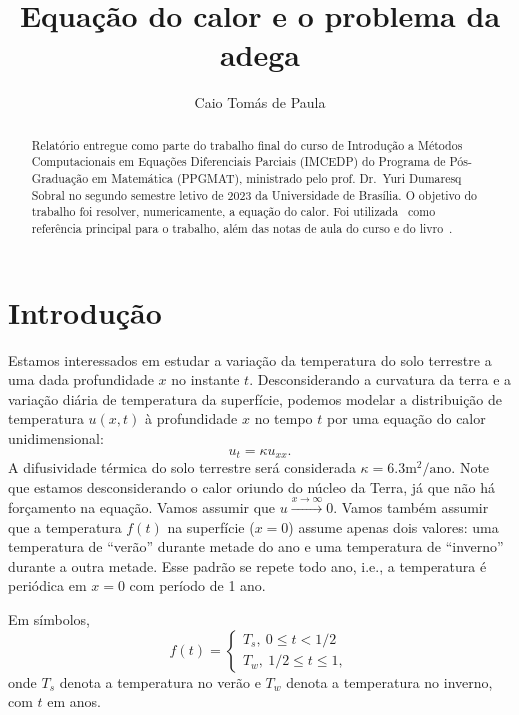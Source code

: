\documentclass[twocolumn,showpacs,%
  nofootinbib,aps,superscriptaddress,%
  eqsecnum,prd,notitlepage,showkeys,10pt]{revtex4-1} %
\renewcommand{\leq}{\leqslant}
\begin{document}
\title{
  Equação do calor e o problema da adega
}
\author{Caio Tomás de Paula}
%
\begin{abstract}
    Relatório entregue como parte do trabalho final do curso de Introdução a
    Métodos Computacionais em Equações Diferenciais Parciais (IMCEDP) do
    Programa de Pós-Graduação em Matemática (PPGMAT),
    ministrado pelo prof. Dr.~Yuri Dumaresq Sobral no segundo semestre letivo
    de 2023 da Universidade de Brasília.
    O objetivo do trabalho foi resolver, numericamente, a equação do calor.
    Foi utilizada~\cite{lin1998} como referência principal para o trabalho, além
    das notas de aula do curso e do livro~\cite{Iserles}.
\end{abstract}
%
\maketitle
%
\section{Introdução}
%
	Estamos interessados em estudar a variação da temperatura do solo terrestre a uma dada
	profundidade $x$ no instante $t$. Desconsiderando a curvatura da terra e a variação diária
	de temperatura da superfície, podemos modelar a distribuição de temperatura $u(x,t)$ à
	profundidade $x$ no tempo $t$ por uma equação do calor unidimensional:
	\begin{equation*}
		u_t = \kappa u_{xx}.
	\end{equation*}
	A difusividade térmica do solo terrestre será considerada $\kappa = 6.3\text{m}^2/\text{ano}$.
	Note que estamos desconsiderando o calor oriundo do núcleo da Terra, já que não há forçamento
	na equação. Vamos assumir que $u \xrightarrow{x\to\infty} 0$. Vamos também assumir que
	a temperatura $f(t)$ na superfície ($x = 0$) assume apenas dois valores: uma temperatura
	de ``verão'' durante metade do ano e uma temperatura de ``inverno'' durante a outra metade.
	Esse padrão se repete todo ano, i.e., a temperatura é periódica em $x=0$ com período de 1 ano.

	Em símbolos,
	\begin{equation*}
		f(t) = \begin{cases}
			T_s, \ 0 \leq t < 1/2 \\
			T_w, \ 1/2 \leq t \leq 1,
		\end{cases}
	\end{equation*}
	onde $T_s$ denota a temperatura no verão e $T_w$ denota a temperatura no inverno, com $t$ em anos.
\end{document}
